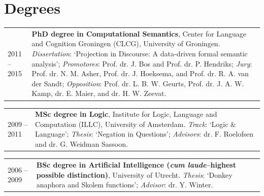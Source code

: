 \documentclass[a4paper,10pt]{article}
\def\leftcolwidth{.12\textwidth}
\def\tablevspace{10pt}
\begin{document}

\section*{Degrees}

\noindent
\begin{tabularx}{\textwidth}{ p{\leftcolwidth} X }
  2011 -- 2015
  & \textbf{PhD degree in Computational Semantics}, 
    Center for Language and Cognition Groningen (CLCG), University of
    Groningen. \textit{Dissertation}: `Projection in Discourse:
    A data-driven formal semantic analysis'; \textit{Promotores}: Prof. dr.
    J. Bos and Prof.  dr. P. Hendriks; \textit{Jury}: Prof. dr. N. M. Asher,
    Prof. dr. J. Hoeksema, and Prof. dr. R. A. van der Sandt;
    \textit{Opposition}: Prof. dr. L. B. W. Geurts, Prof. dr. J. A. W. Kamp,
    dr. E. Maier, and dr. H. W. Zeevat.  
\end{tabularx}

\vspace{\tablevspace}

\noindent
\begin{tabularx}{\textwidth}{ p{\leftcolwidth} X }
  2009 -- 2011
  & \textbf{MSc degree in Logic}, 
    Institute for Logic, Language and Computation (ILLC), University of
    Amsterdam. \textit{Track}: `Logic \& Language'; \textit{Thesis}: `Negation
    in Questions'; \textit{Advisors}: dr. F. Roelofsen and dr. G. Weidman
    Sassoon.
\end{tabularx}

\vspace{\tablevspace}

\noindent
\begin{tabularx}{\textwidth}{ p{\leftcolwidth} X }
  2006 -- 2009
  & \textbf{BSc degree in Artificial Intelligence 
    (\textit{cum laude}--highest possible distinction)}, University of Utrecht.
    \textit{Thesis}: `Donkey anaphora and Skolem functions'; \textit{Advisor}: 
    dr. Y. Winter.
\end{tabularx}

\end{document}
